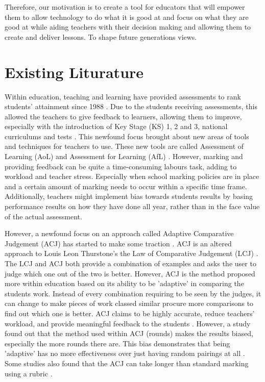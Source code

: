 	Therefore, our motivation is to create a tool for educators that will empower them to allow technology to do what it is good at and focus on what they are good at while aiding teachers with their decision making and allowing them to create and deliver lessons. To shape future generations views.




	\section{Existing Liturature}
	Within education, teaching and learning have provided assessments to rank students' attainment since 1988 \cite{education1988}. Due to the students receiving assessments, this allowed the teachers to give feedback to learners, allowing them to improve, especially with the introduction of Key Stage (KS) 1, 2 and 3, national curriculums and tests \cite{hutchison1994reliable, dillon2011becoming}. This newfound focus brought about new areas of tools and techniques for teachers to use. These new tools are called Assessment of Learning (AoL) and Assessment for Learning (AfL) \cite{wellington2007secondary, dillon2011becoming, black1998inside}. However, marking and providing feedback can be quite a time-consuming labours task, adding to workload and teacher stress. Especially when school marking policies are in place and a certain amount of marking needs to occur within a specific time frame. Additionally, teachers might implement bias towards students results by basing performance results on how they have done all year, rather than in the face value of the actual assessment.
	
	However, a newfound focus on an approach called Adaptive Comparative Judgement (ACJ) has started to make some traction \cite{pollitt2012method}. ACJ is an altered approach to Louis Leon Thurstone's the Law of Comparative Judgement (LCJ) \cite{thurstone1927psychophysical}. The LCJ and ACJ both provide a combination of examples and asks the user to judge which one out of the two is better. However, ACJ is the method proposed more within education based on its ability to be 'adaptive' in comparing the students work. Instead of every combination requiring to be seen by the judges, it can change to make pieces of work classed similar procure more comparisons to find out which one is better. ACJ  claims to be highly accurate, reduce teachers' workload, and provide meaningful feedback to the students \cite{rm_website}. However, a study found out that the method used within ACJ (rounds) makes the results biased, especially the more rounds there are. This bias demonstrates that being 'adaptive' has no more effectiveness over just having random pairings at all \cite{bramley2015investigating}. Some studies also found that the ACJ can take longer than standard marking using a rubric \cite{mcmahon2015comparative, steedle2016evaluating}.
	
